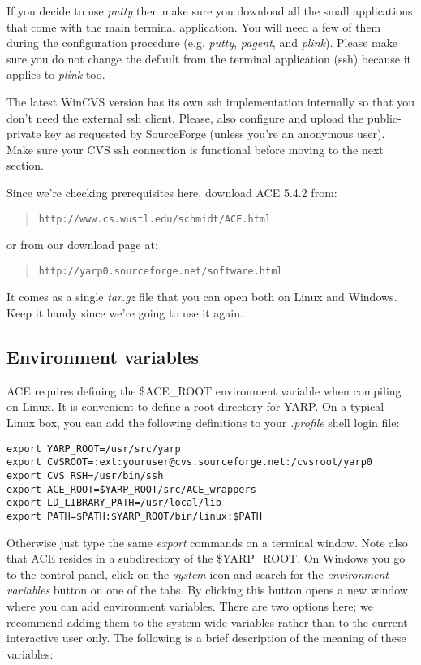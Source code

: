 If you decide to use {\em putty} then make sure you download all the small applications that come with the main terminal application. You will need a few of them during the configuration procedure (e.g. {\em putty}, {\em pagent}, and {\em plink}). Please make sure you do not change the default from the terminal application (ssh) because it applies to {\em plink} too.

The latest WinCVS version has its own ssh implementation internally so that you don't need the external ssh client. Please, also configure and upload the public-private key as requested by SourceForge (unless you're an anonymous user). Make sure your CVS ssh connection is functional before moving to the next section. 

Since we're checking prerequisites here, download ACE 5.4.2 from:

\begin{quote}
{\tt http://www.cs.wustl.edu/schmidt/ACE.html}
\end{quote}

\noindent or from our download page at:
\begin{quote}
{\tt http://yarp0.sourceforge.net/software.html}
\end{quote}

It comes as a single {\em tar.gz} file that you can open both on Linux and Windows. Keep it handy since we're going to use it again.

\subsection{Environment variables}
\label{sect:envvar}
ACE requires defining the \$ACE\_ROOT environment variable when compiling on Linux. It is convenient to define a root directory for YARP. On a typical Linux box, you can add the following definitions to your {\em .profile} shell login file:

\begin{verbatim}
export YARP_ROOT=/usr/src/yarp
export CVSROOT=:ext:youruser@cvs.sourceforge.net:/cvsroot/yarp0
export CVS_RSH=/usr/bin/ssh
export ACE_ROOT=$YARP_ROOT/src/ACE_wrappers
export LD_LIBRARY_PATH=/usr/local/lib
export PATH=$PATH:$YARP_ROOT/bin/linux:$PATH
\end{verbatim}

Otherwise just type the same {\em export} commands on a terminal window. Note also that ACE resides in a subdirectory of the \$YARP\_ROOT. On Windows you go to the control panel, click on the {\em system} icon and search for the {\em environment variables} button on one of the tabs. By clicking this button opens a new window where you can add environment variables. There are two options here; we recommend adding them to the system wide variables rather than to the current interactive user only. The following is a brief description of the meaning of these variables:

